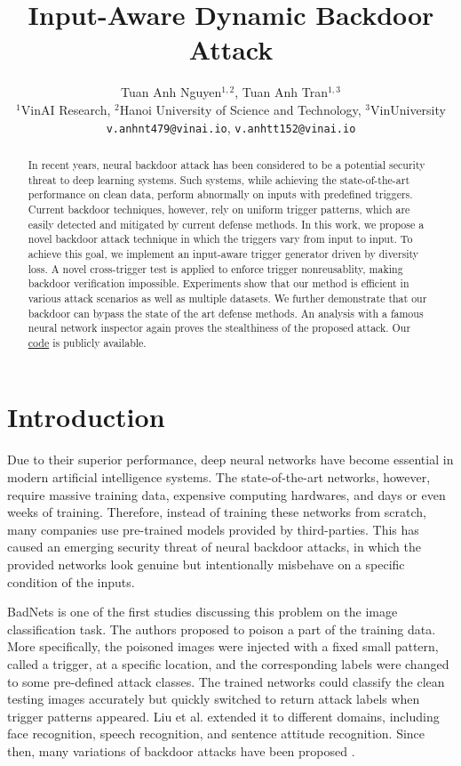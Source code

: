 \documentclass{article}
\title{Input-Aware Dynamic Backdoor Attack}
\author{
  Tuan Anh Nguyen$^{1,2}$, Tuan Anh Tran$^{1,3}$ \\
  $^1$VinAI Research, $^2$Hanoi University of Science and Technology, $^3$VinUniversity \\
  \texttt{v.anhnt479@vinai.io},  \texttt{v.anhtt152@vinai.io} \\
}
\begin{document}

\maketitle

\begin{abstract}
  In recent years, neural backdoor attack has been considered to be a potential security threat to deep learning systems. Such systems, while achieving the state-of-the-art performance on clean data, perform abnormally on inputs with predefined triggers. Current backdoor techniques, however, rely on uniform trigger patterns, which are easily detected and mitigated by current defense methods. In this work, we propose a novel backdoor attack technique in which the triggers vary from input to input. To achieve this goal, we implement an input-aware trigger generator driven by diversity loss. A novel cross-trigger test is applied to enforce trigger nonreusablity, making backdoor verification impossible. Experiments show that our method is efficient in various attack scenarios as well as multiple datasets. We further demonstrate that our backdoor can bypass the state of the art defense methods. An analysis with a famous neural network inspector again proves the stealthiness of the proposed attack. Our \href{https://github.com/VinAIResearch/input-aware-backdoor-attack-release}{code} is publicly available.
\end{abstract}

\section{Introduction}

Due to their superior performance, deep neural networks have become essential in modern artificial intelligence systems. The state-of-the-art networks, however, require massive training data, expensive computing hardwares, and days or even weeks of training. Therefore, instead of training these networks from scratch, many companies use pre-trained models provided by third-parties. This has caused an emerging security threat of neural backdoor attacks, in which the provided networks look genuine but intentionally misbehave on a specific condition of the inputs.

BadNets \cite{gu2017badnets} is one of the first studies discussing this problem on the image classification task. The authors proposed to poison a part of the training data. More specifically, the poisoned images were injected with a fixed small pattern, called a trigger, at a specific location, and the corresponding labels were changed to some pre-defined attack classes. The trained networks could classify the clean testing images accurately but quickly switched to return attack labels when trigger patterns appeared. Liu et al. \cite{liu2017trojaning} extended it to different domains, including face recognition, speech recognition, and sentence attitude recognition. Since then, many variations of backdoor attacks have been proposed \cite{chen2017targeted,yao2019latent}.
\end{document}
